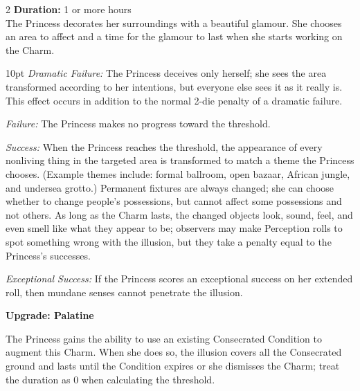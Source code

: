 \begin{multicols}{2}
\noindent \textbf{Duration:} 1 or more hours \\

\noindent The Princess decorates her surroundings with a beautiful glamour. She chooses an area to affect and a time for the glamour to last when she starts working on the Charm.

\begin{myindentpar}{10pt}    \emph{Dramatic Failure:} The Princess deceives only herself; she sees the area transformed according to her intentions, but everyone else sees it as it really is. This effect occurs in addition to the normal 2-die penalty of a dramatic failure. 

\emph{Failure:} The Princess makes no progress toward the threshold.

\emph{Success:} When the Princess reaches the threshold, the appearance of every nonliving thing in the targeted area is transformed to match a theme the Princess chooses. (Example themes include: formal ballroom, open bazaar, African jungle, and undersea grotto.) Permanent fixtures are always changed; she can choose whether to change people’s possessions, but cannot affect some possessions and not others. As long as the Charm lasts, the changed objects look, sound, feel, and even smell like what they appear to be; observers may make Perception rolls to spot something wrong with the illusion, but they take a penalty equal to the Princess’s successes.

\emph{Exceptional Success:} If the Princess scores an exceptional success on her extended roll, then mundane senses cannot penetrate the illusion. 

\textbf{Upgrade: Palatine} 

The Princess gains the ability to use an existing Consecrated Condition to augment this Charm. When she does so, the illusion covers all the Consecrated ground and lasts until the Condition expires or she dismisses the Charm; treat the duration as 0 when calculating the threshold. \end{myindentpar}








\end{multicols}
